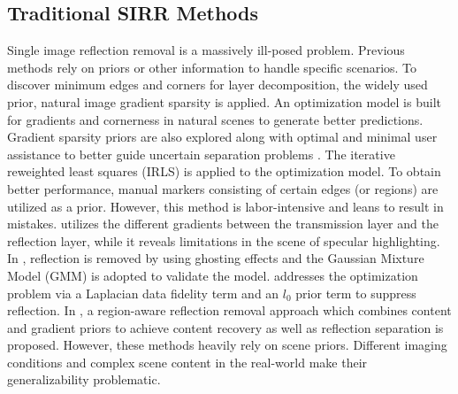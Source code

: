 \documentclass[10pt,journal]{IEEEtran}
\begin{document}
\subsection{Traditional SIRR Methods}
Single image reflection removal is a massively ill-posed problem. Previous methods \cite{levinLearningPerceiveTransparency2002,levinUserAssistedSeparation2007,liSingleImageLayer2014,shihReflectionRemovalUsing2015,wanDepthFieldGuided2016,arvanitopoulosSingleImageReflection2017,wanRegionawareReflectionRemoval2018} rely on priors or other information to handle specific scenarios. 
To discover minimum edges and corners for layer decomposition, the widely used prior, natural image gradient sparsity \cite{levinLearningPerceiveTransparency2002} is applied.
An optimization model is built for gradients and cornerness in natural scenes to generate better predictions. 
Gradient sparsity priors are also explored along with optimal and minimal user assistance to better guide uncertain separation problems \cite{levinUserAssistedSeparation2007}. The iterative reweighted least squares (IRLS) is applied to the optimization model. To obtain better performance, manual markers consisting of certain edges (or regions) are utilized as a prior. However, this method is labor-intensive and leans to result in mistakes. 
\cite{liSingleImageLayer2014} utilizes the different gradients between the transmission layer and the reflection layer, while it reveals limitations in the scene of specular highlighting. 
In \cite{shihReflectionRemovalUsing2015}, reflection is removed by using ghosting effects and the Gaussian Mixture Model (GMM) \cite{zoranLearningModelsNatural2011} is adopted to validate the model. 
\cite{arvanitopoulosSingleImageReflection2017} addresses the optimization problem via a Laplacian data fidelity term and an $l_{0}$ prior term to suppress reflection. 
In \cite{wanRegionawareReflectionRemoval2018}, a region-aware reflection removal approach which combines content and gradient priors to achieve content recovery as well as reflection separation is proposed.
However, these methods heavily rely on scene priors. Different imaging conditions and complex scene content in the real-world make their generalizability problematic. 
\end{document}
